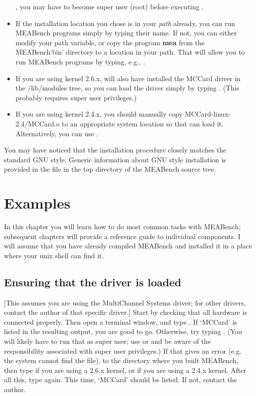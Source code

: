 \documentclass[12pt,oneside]{book}
\def\meabench{{MEABench}\xspace}
\def\prog#1{{\bf #1}}
\def\filename#1{{\sf #1}\xspace}
\begin{document}
\begin{itemize}
, you may have to become super user (root)
before executing .
\item If the installation location you chose is in your {\it path}
already, you can run \meabench programs simply by typing their name. 
If not, you can either modify your path variable, or copy the program
\prog{mea} from the \meabench `bin' directory to a location in your
path. That will allow you to run \meabench programs by typing, e.g.,
.
\item If you are using kernel 2.6.x,   will also have 
installed the MCCard driver in the \filename{/lib/modules} tree, so
you can load the driver simply by typing . 
(This probably requires super user privileges.)
\item If you are using kernel 2.4.x, you should manually copy  
\filename{MCCard-linux-2.4/MCCard.o} to an appropriate system location 
so that  can load it. Alternatively, you can use
.
\end{itemize}

You may have noticed that the installation procedure closely matches
the standard GNU style. Generic information about GNU style
installation is provided in the file  in the top
directory of the \meabench source tree.


\chapter{Examples}\label{chap:examples}

In this chapter you will learn how to do most common tasks with
\meabench; subsequent chapters will provide a reference guide to
individual components. I will assume that you have already compiled
\meabench and installed it in a place where your unix shell can find it.

\section{Ensuring that the driver is loaded}

[This assumes you are using the MultiChannel Systems driver; for other
drivers, contact the author of that specific driver.] Start by
checking that all hardware is connected properly. Then open a terminal
window, and type . If `MCCard' is listed in the resulting
output, you are good to go. Otherwise, try typing
. (You will likely have to run that as super
user; use  or  and be aware of the
responsibility associated with super user privileges.) If that gives
an error (e.g. the system cannot find the file),  to the
directory where you built \meabench, then type  if you are using a 2.6.x kernel, or
 if you are using a 2.4.x
kernel. After all this, type  again. This time, `MCCard'
should be listed. If not, contact the author.
\end{document}
